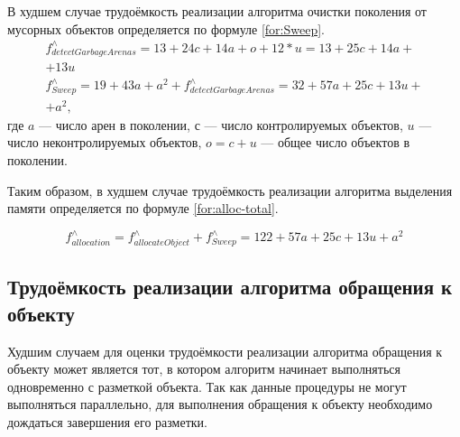 В худшем случае трудоёмкость реализации алгоритма очистки поколения от мусорных объектов определяется по формуле \ref{for:Sweep}.
\begin{equation}
	\label{for:Sweep}
	\begin{array}{l}
		f_{detectGarbageArenas}^{\wedge} = 13 + 24c + 14a + o + 12*u = 13 + 25c + 14a +\\+ 13u\\
		f_{Sweep}^{\wedge} = 19 + 43a + a^2 + f_{detectGarbageArenas}^{\wedge} = 32 + 57a + 25c + 13u +\\+ a^2,
	\end{array}
\end{equation}
где $a$ --- число арен в поколении, $с$ --- число контролируемых объектов, $u$ --- число неконтролируемых объектов, $o = c + u$ --- общее число объектов в поколении.

Таким образом, в худшем случае трудоёмкость реализации алгоритма выделения памяти определяется по формуле \ref{for:alloc-total}.

\begin{equation}
	\label{for:alloc-total}
	f_{allocation}^{\wedge} = f_{allocateObject}^{\wedge} + f_{Sweep}^{\wedge} = 122 + 57a + 25c + 13u + a^2
\end{equation}



\subsection*{Трудоёмкость реализации алгоритма обращения к объекту}

Худшим случаем для оценки трудоёмкости реализации алгоритма обращения к объекту может является тот, в котором алгоритм начинает выполняться одновременно с разметкой объекта. Так как данные процедуры не могут выполняться параллельно, для выполнения обращения к объекту необходимо дождаться завершения его разметки.

